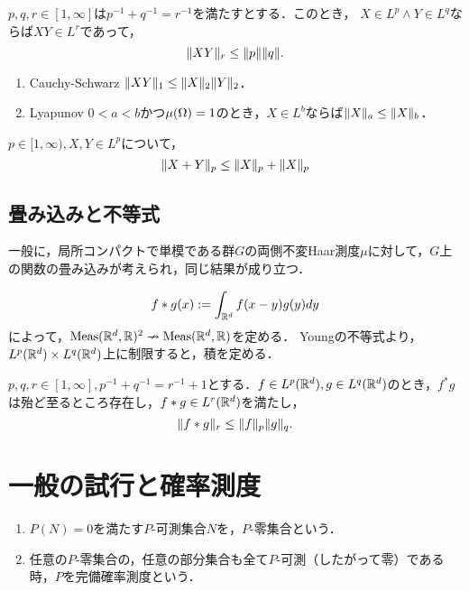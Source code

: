\documentclass[uplatex,dvipdfmx]{jsreport}
\begin{document}
\begin{proposition}[Holder]
    $p,q,r\in[1,\infty]$は$p^{-1}+q^{-1}=r^{-1}$を満たすとする．このとき，
    $X\in L^p\land Y\in L^q$ならば$XY\in L^r$であって，
    \[\|XY\|_r\le\|p\|\|q\|.\]
\end{proposition}

\begin{corollary}\mbox{}
    \begin{enumerate}
        \item Cauchy-Schwarz $\|XY\|_1\le\|X\|_2\|Y\|_2$．
        \item Lyapunov $0<a<b$かつ$\mu(\Omega)=1$のとき，$X\in L^b$ならば$\|X\|_a\le\|X\|_b$．
    \end{enumerate}
\end{corollary}

\begin{proposition}[Minkowski]
    $p\in[1,\infty),X,Y\in L^p$について，
    \[\|X+Y\|_p\le\|X\|_p+\|X\|_p\]
\end{proposition}

\subsection{畳み込みと不等式}

\begin{notation}
    一般に，局所コンパクトで単模である群$G$の両側不変Haar測度$\mu$に対して，$G$上の関数の畳み込みが考えられ，同じ結果が成り立つ．
\end{notation}

\begin{definition}
    \[f*g(x):=\int_{\mathbb{R}^d}f(x-y)g(y)dy\]
    によって，$\mathrm{Meas}(\mathbb{R}^d,\mathbb{R})^2\nrightarrow\mathrm{Meas}(\mathbb{R}^d,\mathbb{R})$を定める．
    Youngの不等式より，$L^p(\mathbb{R}^d)\times L^q(\mathbb{R}^d)$上に制限すると，積を定める．
\end{definition}

\begin{proposition}[Young]
    $p,q,r\in[1,\infty],p^{-1}+q^{-1}=r^{-1}+1$とする．$f\in L^p(\mathbb{R}^d),g\in L^q(\mathbb{R}^d)$のとき，$f^*g$は殆ど至るところ存在し，$f*g\in L^r(\mathbb{R}^d)$を満たし，
    \[\|f*g\|_r\le\|f\|_p\|g\|_q.\]
\end{proposition}

\section{一般の試行と確率測度}

\begin{definition}\mbox{}\label{def-complete-measure}
    \begin{enumerate}
        \item $P(N)=0$を満たす$P$-可測集合$N$を，$P$-零集合という．
        \item 任意の$P$-零集合の，任意の部分集合も全て$P$-可測（したがって零）である時，$P$を完備確率測度という．
    \end{enumerate}
\end{definition}
\end{document}
